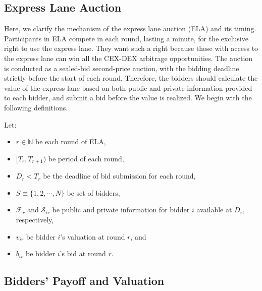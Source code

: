 \subsection{Express Lane Auction}
Here, we clarify the mechanism of the express lane auction (ELA) and its timing. Participants in ELA compete in each round, lasting a minute, for the exclusive right to use the express lane. They want such a right because those with access to the express lane can win all the CEX-DEX arbitrage opportunities. The auction is conducted as a sealed-bid second-price auction, with the bidding deadline strictly before the start of each round. Therefore, the bidders should calculate the value of the express lane based on both public and private information provided to each bidder, and submit a bid before the value is realized. We begin with the following definitions.
\begin{defn}
    Let: \begin{itemize}
        \item \(r \in \mathbb N\) be each round of ELA,
        \item \([T_r, T_{r+1})\) be period of each round,
        \item \(D_r < T_r\) be the deadline of bid submission for each round,
        \item \(S \equiv \{1, 2, \cdots, N\}\) be set of bidders,
        \item \(\mathcal F_r\) and \(\mathcal S_{ir}\) be public and private information for bidder \(i\) available at \(D_r\), respectively,
        \item \(v_{ir} \) be bidder \(i\)'s valuation at round \(r\), and
        \item \(b_{ir}\) be bidder \(i\)'s bid at round \(r\).
    \end{itemize}
\end{defn}

\subsection{Bidders' Payoff and Valuation}

